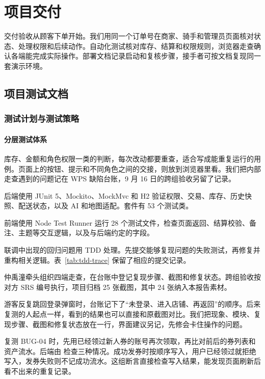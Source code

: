 \chapter{项目交付}\label{chap:delivery}

交付验收从顾客下单开始。我们用同一个订单号在商家、骑手和管理员页面核对状态、处理权限和后续动作。自动化测试核对库存、结算和权限规则，浏览器走查确认各端能完成实际操作。部署文档记录启动和复核步骤，接手者可按文档\mbox{复现同一套演示环境}。

\section{项目测试文档}

\subsection{测试计划与测试策略}

\subsubsection{分层测试体系}

库存、金额和角色权限一类的判断，每次改动都要重查，适合写成能重复运行的用例。页面上的按钮、提示和不同角色之间的交接，则放到浏览器里看。我们把内部走查遇到的问题记在 WPS 缺陷台账，9 月 16 日的跨组验收另留了记录。

\begin{reportpoints}
  \item 后端使用 JUnit 5、Mockito、MockMvc 和 H2 验证权限、交易、库存、历史快照、配送状态，以及 AI 和地图适配。套件有 53 个测试类。
  \item 前端使用 Node Test Runner 运行 28 个测试文件，检查页面返回、结算校验、备注、主题等交互逻辑，以及与后端约定的字段。
  \item 联调中出现的回归问题用 TDD 处理。先提交能够复现问题的失败测试，再修复并重构相关逻辑。表~\ref{tab:tdd-trace} 保留了相应的提交记录。
  \item 仲禹潼牵头组织四端走查，在台账中登记复现步骤、截图和修复状态。跨组验收按对方 SRS 编号执行，项目归档 25 张截图，其中 24 张纳入本报告素材。
\end{reportpoints}

游客反复跳回登录弹窗时，台账记下了“未登录、进入店铺、再返回”的顺序。后来复测的人起点一样，看到的结果也可以直接和原截图对比。我们把现象、模块、复现步骤、截图和修复状态放在一行，界面建议另记，先修会卡住操作的问题。

复测 BUG-04 时，先用已经领过新人券的账号再次领取，再比对前后的券列表和资产流水。后端由 \mbox{} 检查三种情况。成功发券时按顺序写入，用户已经领过就拒绝写入，发券失败则不记成功流水。这组断言直接检查写入结果，能发现页面刷新后看不出来的重复记录。

